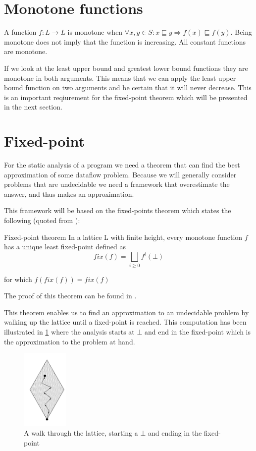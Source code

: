 \section{Monotone functions}
A function $f: L \to L$ is monotone when $\forall x,y \in S : x \sqsubseteq y \Rightarrow f(x) \sqsubseteq f(y)$.
Being monotone does not imply that the function is increasing.
All constant functions are monotone.

If we look at the least upper bound and greatest lower bound functions they are monotone in both arguments.
This means that we can apply the least upper bound function on two arguments and be certain that it will never decrease.
This is an important reqiurement for the fixed-point theorem which will be presented in the next section.

\section{Fixed-point}
For the static analysis of a program we need a theorem that can find the best approximation of some dataflow problem.
Because we will generally consider problems that are undecidable  we need a framework that overestimate the answer, and thus makes an approximation.

This framework will be based on the fixed-points theorem which states the following (quoted from \citet[p.~13]{schwartzbach}):

\begin{definition}{Fixed-point theorem}
In a lattice L with finite height, every monotone function $f$ has a unique least fixed-point defined as
\[ fix(f) = \bigsqcup_{i \ge 0} f^i(\bot) \]

for which $f(fix(f)) = fix(f)$
\end{definition}

\noindent
The proof of this theorem can be found in \citep[p.~13]{schwartzbach}.

This theorem enables us to find an approximation to an undecidable problem by walking up the lattice until a fixed-point is reached.
This computation has been illustrated in \cref{lattice_walk} where the analysis starts at $\bot$ and end in the fixed-point which is the approximation to the problem at hand.

\begin{figure}
\begin{center}
\includegraphics[width=0.2\textwidth]{figures/fixed-point_walk}
\end{center}
\caption{A walk through the lattice, starting a $\bot$ and ending in the fixed-point}
\label{lattice_walk}
\end{figure}

